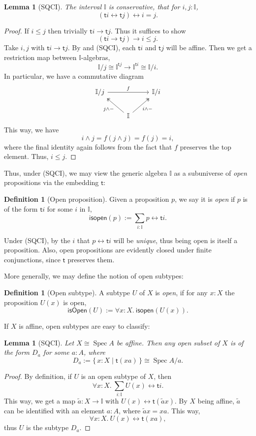 \documentclass[12pt]{amsart}
\newtheorem{lemma}[theorem]{Lemma}
\theoremstyle{definition}
\newtheorem{definition}[theorem]{Definition}
\newcommand{\mbb}[1]{\mathbb{#1}}
\newcommand{\I}{\mbb I}
\newcommand{\ms}[1]{\mathsf{#1}}
\newcommand{\qsi}[1]{\tilde{#1}}
\newcommand{\scomp}[2]{\{\,#1\mid#2\,\}}
\newcommand{\fa}[2]{\forall #1\!\colon\!\!#2.\ }
\newcommand{\eq}{\leftrightarrow}
\newcommand{\spec}{\operatorname{Spec}}
\begin{document}
\begin{lemma}[SQCI]\label{lem:intconserve}
  The interval $\I$ is \emph{conservative}, that for $i,j : \I$,
  \[ (\ms ti \eq \ms tj) \eq i = j. \]
\end{lemma}
\begin{proof}
  If $i \le j$ then trivially $\ms ti \to \ms tj$. Thus it suffices to show
  \[ (\ms ti \to \ms tj) \to i \le j. \]
  Take $i,j$ with $\ms ti \to \ms tj$. By  and (SQCI), each $\ms ti$ and $\ms tj$ will be affine. Then we get a restriction map between $\I$-algebras,
  \[ \I/j \cong \I^{\ms tj} \to \I^{\ms ti} \cong \I/i. \]
  In particular, we have a commutative diagram
  \[
  \begin{tikzcd}
    \I/j \ar[rr, "f"] & & \I/i \\
    & \I \ar[ul, two heads, "j \wedge -"] \ar[ur, two heads, "i \wedge -"']
  \end{tikzcd}
  \]
  This way, we have
  \[ i \wedge j = f(j \wedge j) = f(j) = i, \]
  where the final identity again follows from the fact that $f$ preserves the top element. Thus, $i \le j$. 
\end{proof}

Thus, under (SQCI), we may view the generic algebra $\I$ as a subuniverse of \emph{open} propositions via the embedding $\ms t$:

\begin{definition}[Open proposition]
  Given a proposition $p$, we say it is \emph{open} if $p$ is of the form $\ms ti$ for some $i$ in $\I$,
  \[ \ms{isopen}(p) := \sum_{i:\I}p \eq \ms ti. \]
\end{definition}

Under (SQCI), by  the $i$ that $p \eq \ms ti$ will be \emph{unique}, thus being open is itself a proposition. Also, open propositions are evidently closed under finite conjunctions, since $\ms t$ preserves them. 

More generally, we may define the notion of open subtypes:

\begin{definition}[Open subtype]
  A subtype $U$ of $X$ is \emph{open}, if for any $x:X$ the proposition $U(x)$ is open,
  \[ \ms{isOpen}(U) := \fa xX \ms{isopen}(U(x)). \]
\end{definition}

If $X$ is affine, open subtypes are easy to classify:

\begin{lemma}[SQCI]\label{lem:openofaffinegivesalgebra}
  Let $X \cong \spec A$ be affine. Then any open subset of $X$ is of the form $D_a$ for some $a:A$, where
  \[ D_a := \scomp{x : X}{\ms t(xa)} \cong \spec A/a. \]
\end{lemma}
\begin{proof}
  By definition, if $U$ is an open subtype of $X$, then 
  \[ \fa xX\sum_{i:\I}U(x) \eq \ms ti. \] 
  This way, we get a map $\qsi a : X \to \I$ with $U(x) \eq \ms t(\qsi ax)$. By $X$ being affine, $\qsi a$ can be identified with an element $a:A$, where $\qsi ax = xa$. This way,
  \[ \fa xX U(x) \eq \ms t(xa), \]
  thus $U$ is the subtype $D_a$.
\end{proof}
\end{document}
